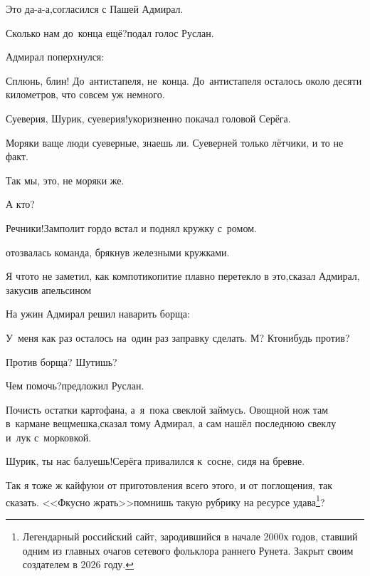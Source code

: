 \diagdash Это да-а-а,\mdash согласился с Пашей Адмирал.

\diagdash Сколько нам до~конца ещё?\mdash подал голос Руслан.

Адмирал поперхнулся:

\diagdash Сплюнь, блин! До~антистапеля, не~конца. До~антистапеля осталось около десяти километров, что совсем уж немного.

\diagdash Суеверия, Шурик, суеверия!\mdash укоризненно покачал головой Серёга.

\diagdash Моряки ваще люди суеверные, знаешь ли. Суеверней только лётчики, и то не факт.

\diagdash Так мы, это, не моряки же.

\diagdash А кто?

\diagdash Речники!\mdash Замполит гордо встал и поднял кружку с~ромом.

\mdash отозвалась команда, брякнув железными кружками.

\diagdash Я что\sdash то не заметил, как компотикопитие плавно перетекло в это,\mdash сказал Адмирал, закусив апельсином\myldots{}

\myldots На ужин Адмирал решил наварить борща:

\diagdash У~меня как раз осталось на~один раз заправку сделать. М? Кто\sdash нибудь против?

\diagdash Против борща? Шутишь?

\diagdash Чем помочь?\mdash предложил Руслан.

\diagdash Почисть остатки картофана, а~я~пока свеклой займусь. Овощной нож там в~кармане вещмешка,\mdash сказал тому Адмирал, а сам нашёл последнюю свеклу и~лук с~морковкой.

\diagdash Шурик, ты нас балуешь!\mdash Серёга привалился к~сосне, сидя на бревне.

\renewcommand*{\thefootnote}{\arabic{footnote}}
\setcounter{footnote}{0}

\diagdash Так я тоже ж кайфую\mdash и от приготовления всего этого, и от поглощения, так сказать. <<Фкусно жрать>>\mdash помнишь такую рубрику на ресурсе удава\footnote{Легендарный российский сайт, зародившийся в начале 2000\sdash х годов, ставший одним из главных очагов сетевого фольклора раннего Рунета. Закрыт своим создателем в 2026 году.}?

